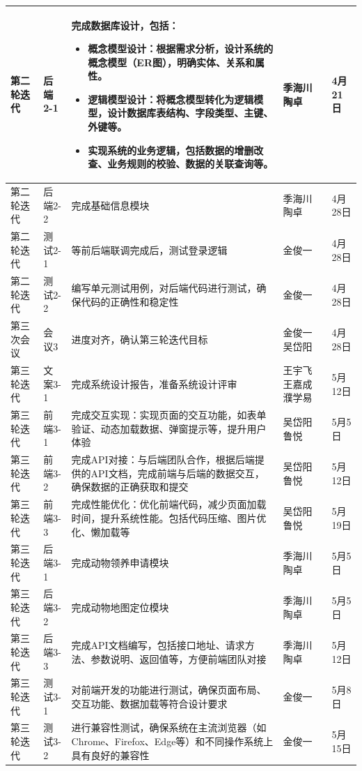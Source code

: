 \documentclass[12pt,a4paper,UTF8]{article}
\begin{document}
\begin{xltabular}{\linewidth}{|>{\centering\arraybackslash}p{2.2cm}|>{\centering\arraybackslash}p{2cm}|>{\raggedright\arraybackslash}p{6cm}|>{\centering\arraybackslash}p{1.5cm}|>{\centering\arraybackslash}p{2cm}|}
  第二轮迭代 & 后端2-1 & 完成数据库设计，包括：
  \begin{itemize}[topsep=0pt, partopsep=0pt, left=0pt, nosep]
    \item 概念模型设计：根据需求分析，设计系统的概念模型（ER图），明确实体、关系和属性。
    \item 逻辑模型设计：将概念模型转化为逻辑模型，设计数据库表结构、字段类型、主键、外键等。
    \item 实现系统的业务逻辑，包括数据的增删改查、业务规则的校验、数据的关联查询等。
  \end{itemize}
  & 季海川 陶卓 & 4月21日 \\ \hline
  第二轮迭代 & 后端2-2 & 完成基础信息模块 & 季海川 陶卓 & 4月28日 \\ \hline
  第二轮迭代 & 测试2-1 & 等前后端联调完成后，测试登录逻辑 & 金俊一 & 4月28日 \\ \hline
  第二轮迭代 & 测试2-2 & 编写单元测试用例，对后端代码进行测试，确保代码的正确性和稳定性 & 金俊一 & 4月28日 \\ \hline
  第三次会议 & 会议3 & 进度对齐，确认第三轮迭代目标 & 金俊一 吴岱阳 & 4月28日 \\ \hline
  第三轮迭代 & 文案3-1 & 完成系统设计报告，准备系统设计评审 & 王宇飞 王嘉成 濮学易 & 5月12日 \\ \hline
  第三轮迭代 & 前端3-1 & 完成交互实现：实现页面的交互功能，如表单验证、动态加载数据、弹窗提示等，提升用户体验 & 吴岱阳 鲁悦 & 5月5日 \\ \hline
  第三轮迭代 & 前端3-2 & 完成API对接：与后端团队合作，根据后端提供的API文档，完成前端与后端的数据交互，确保数据的正确获取和提交 & 吴岱阳 鲁悦 & 5月12日 \\ \hline
  第三轮迭代 & 前端3-3 & 完成性能优化：优化前端代码，减少页面加载时间，提升系统性能。包括代码压缩、图片优化、懒加载等 & 吴岱阳 鲁悦 & 5月19日 \\ \hline
  第三轮迭代 & 后端3-1 & 完成动物领养申请模块 & 季海川 陶卓 & 5月5日 \\ \hline
  第三轮迭代 & 后端3-2 & 完成动物地图定位模块 & 季海川 陶卓 & 5月5日 \\ \hline
  第三轮迭代 & 后端3-3 & 完成API文档编写，包括接口地址、请求方法、参数说明、返回值等，方便前端团队对接 & 季海川 陶卓 & 5月12日 \\ \hline
  第三轮迭代 & 测试3-1 & 对前端开发的功能进行测试，确保页面布局、交互功能、数据加载等符合设计要求 & 金俊一 & 5月8日 \\ \hline
  第三轮迭代 & 测试3-2 & 进行兼容性测试，确保系统在主流浏览器（如Chrome、Firefox、Edge等）和不同操作系统上具有良好的兼容性 & 金俊一 & 5月15日 \\ \hline

\end{xltabular}
\end{document}
